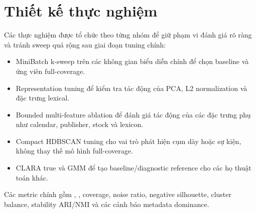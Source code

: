 \section{Thiết kế thực nghiệm}

Các thực nghiệm được tổ chức theo từng nhóm để giữ phạm vi đánh giá rõ ràng và tránh sweep quá rộng sau giai đoạn tuning chính:

\begin{itemize}
  \item MiniBatch k-sweep trên các không gian biểu diễn chính để chọn baseline và ứng viên full-coverage.
  \item Representation tuning để kiểm tra tác động của PCA, L2 normalization và đặc trưng lexical.
  \item Bounded multi-feature ablation để đánh giá tác động của các đặc trưng phụ như calendar, publisher, stock và lexicon.
  \item Compact HDBSCAN tuning cho vai trò phát hiện cụm dày hoặc sự kiện, không thay thế mô hình full-coverage.
  \item CLARA true và GMM để tạo baseline/diagnostic reference cho các họ thuật toán khác.
\end{itemize}

Các metric chính gồm , , coverage, noise ratio, negative silhouette, cluster balance, stability ARI/NMI và các cảnh báo metadata dominance.
